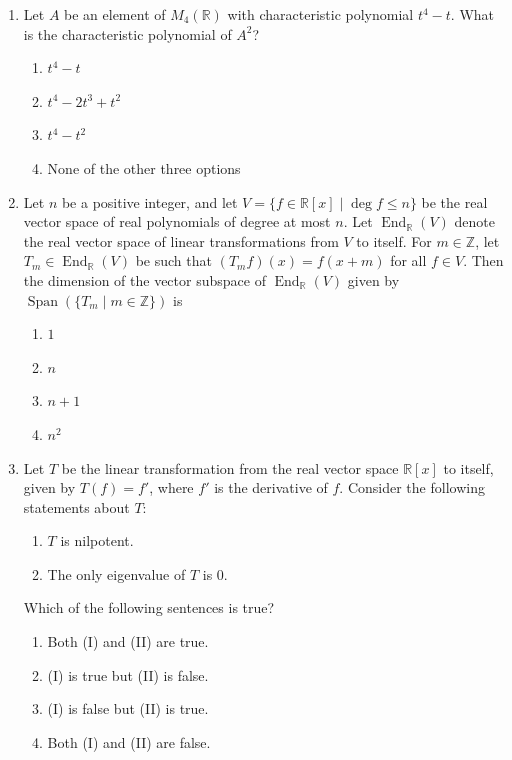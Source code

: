\documentclass[11pt, a4paper]{article}
\begin{document}
\begin{enumerate}
  \item Let $A$ be an element of $M_4(\mathbb{R})$ with characteristic polynomial $t^4 - t$. What is the characteristic polynomial of $A^2$?
  \begin{enumerate}[label=(\alph*)]
    \item $t^4 - t$
    \item $t^4 - 2t^3 + t^2$
    \item $t^4 - t^2$
    \item None of the other three options
  \end{enumerate}

  \item Let $n$ be a positive integer, and let $V = \{f \in \mathbb{R}[x] \mid \deg f \le n\}$ be the real vector space of real polynomials of degree at most $n$. Let $\operatorname{End}_{\mathbb{R}}(V)$ denote the real vector space of linear transformations from $V$ to itself. For $m \in \mathbb{Z}$, let $T_m \in \operatorname{End}_{\mathbb{R}}(V)$ be such that $(T_m f)(x) = f(x + m)$ for all $f \in V$. Then the dimension of the vector subspace of $\operatorname{End}_{\mathbb{R}}(V)$ given by $\operatorname{Span}(\{T_m \mid m \in \mathbb{Z}\})$ is
  \begin{enumerate}[label=(\alph*)]
    \item $1$
    \item $n$
    \item $n + 1$
    \item $n^2$
  \end{enumerate}

  \item Let $T$ be the linear transformation from the real vector space $\mathbb{R}[x]$ to itself, given by $T(f) = f'$, where $f'$ is the derivative of $f$. Consider the following statements about $T$:
  \begin{enumerate}[label=(\Roman*)]
    \item $T$ is nilpotent.
    \item The only eigenvalue of $T$ is $0$.
  \end{enumerate}
  Which of the following sentences is true?
  \begin{enumerate}[label=(\alph*)]
    \item Both (I) and (II) are true.
    \item (I) is true but (II) is false.
    \item (I) is false but (II) is true.
    \item Both (I) and (II) are false.
  \end{enumerate}


\end{enumerate}
\end{document}
